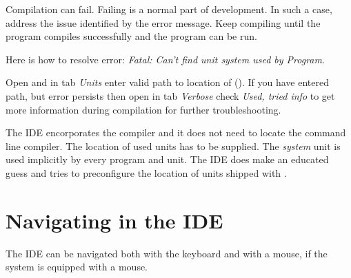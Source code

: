 Compilation can fail. Failing is a normal part of development. In such a
case, address the issue identified by the error message. 
Keep compiling until the program compiles successfully and the program can be run.

Here is how to resolve error: \emph{Fatal: Can't find unit system used by Program}.

Open  and in tab \emph{Units} enter valid path to
location of  (). If you have entered path,
but error persists then open  in tab \emph{Verbose}
check \emph{Used, tried info} to get more information during compilation for
further troubleshooting. 

\begin{remark}
The IDE encorporates the compiler and it does not need to locate the command
line compiler. The location of used units has to be supplied. The \emph{system}
unit is used implicitly by every program and unit. The IDE does make an educated 
guess and tries to preconfigure the location of units shipped with \fpc.
\end{remark}

\section{Navigating in the IDE}
The IDE can be navigated both with the keyboard and with a mouse, if the
system is equipped with a mouse.
%
%
